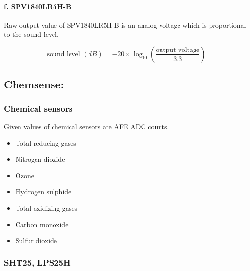 % 


\paragraph{f. SPV1840LR5H-B}

Raw output value of SPV1840LR5H-B is an analog voltage which is proportional to the sound level.
 
\bigbreak
{\centering
\[ \text{sound level } (dB) = -20 \times \log_{10} \left( \frac{\text{output voltage}}{3.3}\right) \]
\par
}


\bigbreak
\subsection{Chemsense:}
\subsubsection{ Chemical sensors}

Given values of chemical sensors are AFE ADC counts.

\begin{itemize}
  \item Total reducing gases
  \item Nitrogen dioxide
  \item Ozone
  \item Hydrogen sulphide
  \item Total oxidizing gases
  \item Carbon monoxide
  \item Sulfur dioxide
\end{itemize}


\subsubsection{ SHT25, LPS25H}

